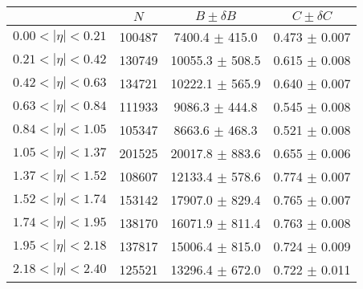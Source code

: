 \begin{tabular}{lccc}
\hline
    &   $N$   & $B \pm \delta B$  &  $C \pm \delta C$ \\
\hline
$0.00 < |\eta| <0.21$          & 100487     & 7400.4     $\pm$ 415.0 & 0.473      $\pm$ 0.007 \\
$0.21 < |\eta| <0.42$          & 130749     & 10055.3    $\pm$ 508.5 & 0.615      $\pm$ 0.008 \\
$0.42 < |\eta| <0.63$          & 134721     & 10222.1    $\pm$ 565.9 & 0.640      $\pm$ 0.007 \\
$0.63 < |\eta| <0.84$          & 111933     & 9086.3     $\pm$ 444.8 & 0.545      $\pm$ 0.008 \\
$0.84 < |\eta| <1.05$          & 105347     & 8663.6     $\pm$ 468.3 & 0.521      $\pm$ 0.008 \\
$1.05 < |\eta| <1.37$          & 201525     & 20017.8    $\pm$ 883.6 & 0.655      $\pm$ 0.006 \\
$1.37 < |\eta| <1.52$          & 108607     & 12133.4    $\pm$ 578.6 & 0.774      $\pm$ 0.007 \\
$1.52 < |\eta| <1.74$          & 153142     & 17907.0    $\pm$ 829.4 & 0.765      $\pm$ 0.007 \\
$1.74 < |\eta| <1.95$          & 138170     & 16071.9    $\pm$ 811.4 & 0.763      $\pm$ 0.008 \\
$1.95 < |\eta| <2.18$          & 137817     & 15006.4    $\pm$ 815.0 & 0.724      $\pm$ 0.009 \\
$2.18 < |\eta| <2.40$          & 125521     & 13296.4    $\pm$ 672.0 & 0.722      $\pm$ 0.011 \\
\hline
\end{tabular}
